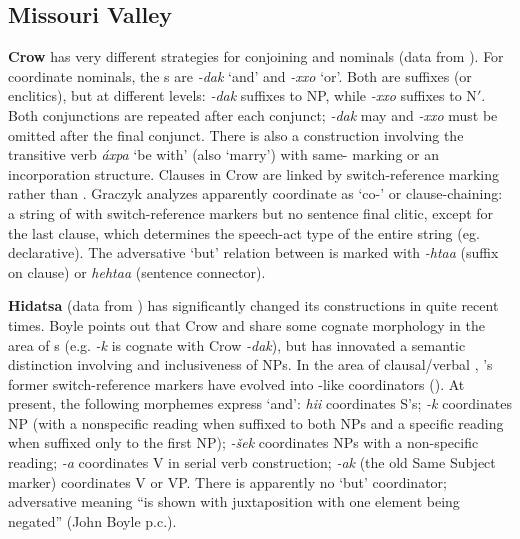 \documentclass[output=paper]{LSP/langsci}
\begin{document}
\subsection{Missouri Valley}
 
\textbf{Crow} has very different strategies for conjoining  and
nominals (data from \citealt{Graczyk2007}). For coordinate nominals, the s are \textit{-dak} `and' and \textit{-xxo} `or'. Both are suffixes (or enclitics), but at different levels: \textit{-dak} suffixes to NP, while \textit{-xxo} suffixes to N$'$. Both conjunctions are repeated after each conjunct; \textit{-dak} may and \textit{-xxo} must be omitted after the final conjunct. There is also a  construction involving the transitive verb \textit{áxpa} `be with' (also `marry') with same- marking or an incorporation structure. Clauses in Crow are linked by switch-reference marking rather than . Graczyk analyzes apparently coordinate  as `co-' or clause-chaining: a string of  with switch-reference markers but no sentence final clitic, except for the last clause, which determines the speech-act type of the entire string (eg. declarative). The adversative `but' relation between  is marked with \textit{-htaa} (suffix on clause) or \textit{hehtaa} (sentence connector).

\textbf{Hidatsa} (data from \citealt{Boyle2005,Boyle2007,Boyle2011}) has significantly changed its  constructions in quite recent times. Boyle points out that Crow and  share some cognate morphology in the area of s (e.g.  \textit{-k} is cognate with Crow \textit{-dak}), but  has innovated a semantic distinction involving  and inclusiveness of NPs. In the area of clausal/verbal , 's former switch-reference markers have evolved into -like coordinators (\citealt{Boyle2011}). At present, the following morphemes express `and': \textit{hii} coordinates S's; \textit{-k} coordinates NP (with a nonspecific reading when suffixed to both NPs and a specific reading when suffixed only to the first NP); \textit{-\v{s}ek} coordinates NPs with a non-specific reading; \textit{-a} coordinates V in serial verb construction; \textit{-ak} (the old Same Subject marker) coordinates V or VP. There is apparently no `but' coordinator; adversative meaning ``is shown with juxtaposition with one element being negated'' (John Boyle p.c.).
\end{document}
